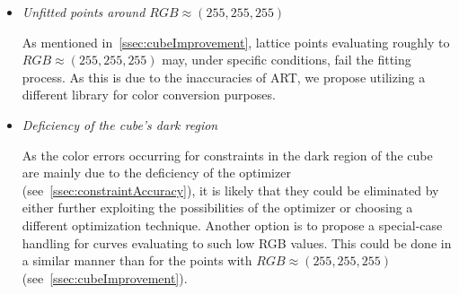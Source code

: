 \begin{itemize}
	\item{\emph{Unfitted points around $RGB\approx(255, 255, 255)$}}
	
	As mentioned in~\cref{ssec:cubeImprovement}, lattice points evaluating roughly to $RGB\approx(255, 255, 255)$ may, under specific conditions, fail the fitting process. As this is due to the inaccuracies of ART, we propose utilizing a different library for color conversion purposes.
	
	\item{\emph{Deficiency of the cube's dark region}}
	
	As the color errors occurring for constraints in the dark region of the cube are mainly due to the deficiency of the optimizer (see~\cref{ssec:constraintAccuracy}), it is likely that they could be eliminated by either further exploiting the possibilities of the optimizer or choosing a different optimization technique. Another option is to propose a special-case handling for curves evaluating to such low RGB values. This could be done in a similar manner than for the points with $RGB\approx(255, 255, 255)$ (see~\cref{ssec:cubeImprovement}).
	
	
\end{itemize}